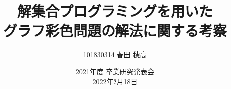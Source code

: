 \documentclass[dvipdfmx,11pt]{beamer}
\title{解集合プログラミングを用いた\\グラフ彩色問題の解法に関する考察}
\author{101830314 春田 穂高}
\institute{番原研究室}
\date{2021年度 卒業研究発表会\\2022年2月18日}
\begin{document}
\frame{\maketitle}

\end{document}

